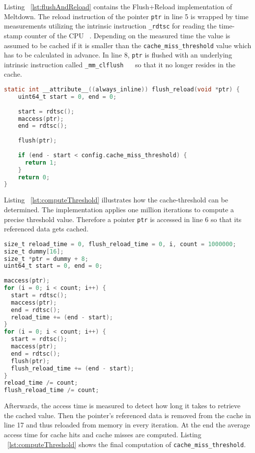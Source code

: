 \documentclass[a4paper,oneside,openright] {scrreprt}
\begin{document}
Listing ~\ref{lst:flushAndReload} contains the Flush+Reload implementation of Meltdown. 
The reload instruction of the pointer \texttt{ptr} in line 5 is wrapped 
by time measurements utilizing the intrinsic instruction \texttt{\_rdtsc} for reading the time-stamp counter of the CPU ~\cite{intelintrinsics}. 
Depending on the measured time the value is assumed to be cached if it is smaller
than the \texttt{cache\_miss\_threshold} value which has to be calculated in advance.
In line 8, \texttt{ptr} is flushed with an underlying intrinsic instruction called \texttt{\_mm\_clflush } ~\cite{intelintrinsics}
so that it no longer resides in the cache.

\begin{lstlisting}[language=C, caption=Meltdown: Flush+Reload, label={lst:flushAndReload}]
static int __attribute__((always_inline)) flush_reload(void *ptr) {
    uint64_t start = 0, end = 0;
  
    start = rdtsc();
    maccess(ptr);
    end = rdtsc();
  
    flush(ptr);
  
    if (end - start < config.cache_miss_threshold) {
      return 1;
    }
    return 0;
}
\end{lstlisting}

Listing ~\ref{lst:computeThreshold} illustrates how the cache-threshold can be determined.
The implementation applies one million iterations to compute a precise threshold value.
Therefore a pointer \texttt{ptr} is accessed in line 6 so that its referenced data gets cached.
\newpage

\begin{lstlisting}[language=C, caption=Meltdown: Cache Miss Threshold 1, label={lst:computeThreshold}]
size_t reload_time = 0, flush_reload_time = 0, i, count = 1000000;
size_t dummy[16];
size_t *ptr = dummy + 8;
uint64_t start = 0, end = 0;
  
maccess(ptr);
for (i = 0; i < count; i++) {
  start = rdtsc();
  maccess(ptr);
  end = rdtsc();
  reload_time += (end - start);
}
for (i = 0; i < count; i++) {
  start = rdtsc();
  maccess(ptr);
  end = rdtsc();
  flush(ptr);
  flush_reload_time += (end - start);
}
reload_time /= count;
flush_reload_time /= count;
\end{lstlisting}

Afterwards, the access time is measured to detect how long it takes to retrieve the cached value. 
Then the pointer's referenced data is removed from the cache in line 17 and thus reloaded from memory in every iteration.
At the end the average access time for cache hits and cache misses are computed.
Listing ~\ref{lst:computeThreshold} shows the final computation of \texttt{cache\_miss\_threshold}.
\end{document}
